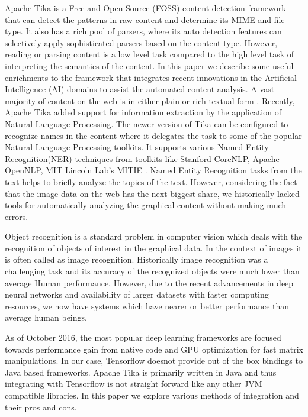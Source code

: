 \documentclass[letterpaper, 10 pt, conference]{ieeeconf}  %
\begin{document}
Apache Tika\cite{mattmann2011tika} is a Free and Open Source (FOSS) content detection framework that can detect the patterns in raw content and determine its MIME and file type. It also has a rich pool of parsers, where its auto detection features can selectively apply sophisticated parsers based on the content type. However, reading or parsing content is a low level task compared to the high level task of interpreting the semantics of the content. In this paper we describe some useful enrichments to the framework that integrates recent innovations in the Artificial Intelligence (AI) domains to assist the automated content analysis. A vast majority of content on the web is in either plain or rich textual form \cite{}. Recently, Apache Tika added support for information extraction by the application of Natural Language Processing\cite{}. The newer version of Tika can be configured to recognize names in the content where it delegates the task to some of the popular Natural Language Processing toolkits. It supports various Named Entity Recognition(NER) techniques from toolkits like Stanford CoreNLP\cite{}, Apache OpenNLP\cite{}, MIT Lincoln Lab's MITIE \cite{}. Named Entity Recognition tasks from the text helps to briefly analyze the topics of the text. However, considering the fact that the image data on the web has the next biggest share, we historically lacked tools for automatically analyzing the graphical content without making much errors.

Object recognition is a standard problem in computer vision which deals with the recognition of objects of interest in the graphical data. In the context of images it is often called as image recognition. Historically image recognition was a challenging task and its accuracy of the recognized objects were much lower than average Human performance. However, due to the recent advancements in deep neural networks and availability of larger datasets with faster computing resources, we now have systems which have nearer or better performance than average human beings.



As of October 2016, the most popular deep learning frameworks are focused towards performance gain from native code and GPU optimization for fast matrix manipulations\cite{}. In our case, Tensorflow doesnot provide out of the box bindings to Java based frameworks. Apache Tika is primarily written in Java and thus integrating with Tensorflow is not straight forward like any other JVM compatible libraries. In this paper we explore various methods of integration and their pros and cons.
\end{document}
